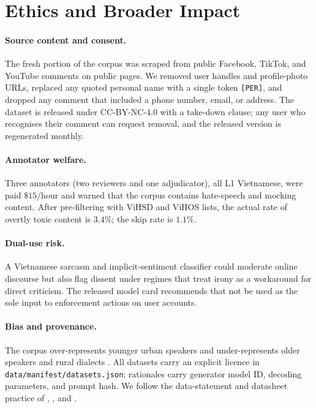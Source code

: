 \section{Ethics and Broader Impact}

\paragraph{Source content and consent.}
The fresh portion of the \method{} corpus was scraped from public
Facebook, TikTok, and YouTube comments on public pages. We removed
user handles and profile-photo URLs, replaced any quoted personal
name with a single token \texttt{[PER]}, and dropped any comment that
included a phone number, email, or address. The dataset is released
under CC-BY-NC-4.0 with a take-down clause; any user who recognises
their comment can request removal, and the released version is
regenerated monthly.

\paragraph{Annotator welfare.}
Three annotators (two reviewers and one adjudicator), all L1
Vietnamese, were paid $\$15$/hour and warned that the corpus contains
hate-speech and mocking content. After pre-filtering with ViHSD
\citep{vihsd2021} and ViHOS \citep{vihos2023} lists, the actual rate
of overtly toxic content is $3.4\%$; the skip rate is $1.1\%$.

\paragraph{Dual-use risk.}
A Vietnamese sarcasm and implicit-sentiment classifier could moderate
online discourse but also flag dissent under regimes that treat
irony as a workaround for direct criticism. The released model card
\citep{mitchell2019modelcards} recommends that \method{} not be used
as the sole input to enforcement actions on user accounts.

\paragraph{Bias and provenance.}
The corpus over-represents younger urban speakers and under-represents
older speakers and rural dialects \citep{vimd2024}. All datasets carry
an explicit licence in \texttt{data/manifest/datasets.json}; rationales
carry generator model ID, decoding parameters, and prompt hash. We
follow the data-statement and datasheet practice of
\citet{bender2018datastatements}, \citet{gebru2021datasheets}, and
\citet{bender2021stochastic}.
